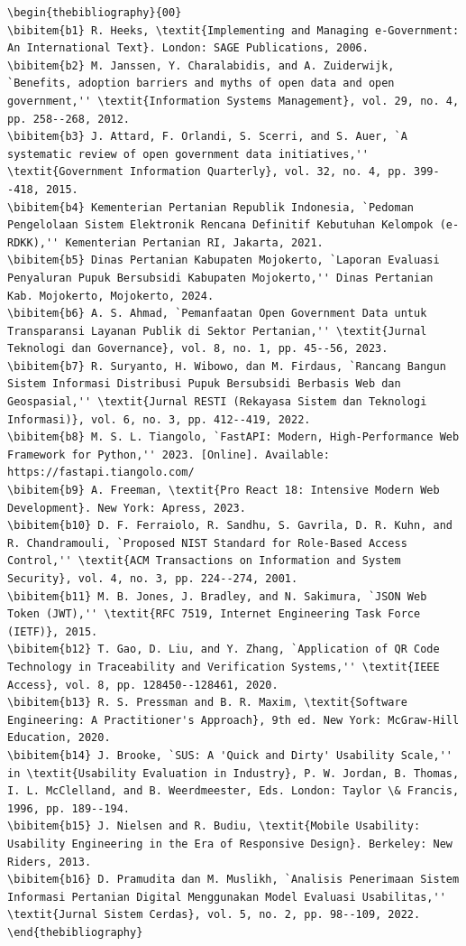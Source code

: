 \documentclass[conference]{IEEEtran}
\begin{document}
\begin{lstlisting}
\begin{thebibliography}{00}
\bibitem{b1} R. Heeks, \textit{Implementing and Managing e-Government: An International Text}. London: SAGE Publications, 2006.
\bibitem{b2} M. Janssen, Y. Charalabidis, and A. Zuiderwijk, `Benefits, adoption barriers and myths of open data and open government,'' \textit{Information Systems Management}, vol. 29, no. 4, pp. 258--268, 2012.
\bibitem{b3} J. Attard, F. Orlandi, S. Scerri, and S. Auer, `A systematic review of open government data initiatives,'' \textit{Government Information Quarterly}, vol. 32, no. 4, pp. 399--418, 2015.
\bibitem{b4} Kementerian Pertanian Republik Indonesia, `Pedoman Pengelolaan Sistem Elektronik Rencana Definitif Kebutuhan Kelompok (e-RDKK),'' Kementerian Pertanian RI, Jakarta, 2021.
\bibitem{b5} Dinas Pertanian Kabupaten Mojokerto, `Laporan Evaluasi Penyaluran Pupuk Bersubsidi Kabupaten Mojokerto,'' Dinas Pertanian Kab. Mojokerto, Mojokerto, 2024.
\bibitem{b6} A. S. Ahmad, `Pemanfaatan Open Government Data untuk Transparansi Layanan Publik di Sektor Pertanian,'' \textit{Jurnal Teknologi dan Governance}, vol. 8, no. 1, pp. 45--56, 2023.
\bibitem{b7} R. Suryanto, H. Wibowo, dan M. Firdaus, `Rancang Bangun Sistem Informasi Distribusi Pupuk Bersubsidi Berbasis Web dan Geospasial,'' \textit{Jurnal RESTI (Rekayasa Sistem dan Teknologi Informasi)}, vol. 6, no. 3, pp. 412--419, 2022.
\bibitem{b8} M. S. L. Tiangolo, `FastAPI: Modern, High-Performance Web Framework for Python,'' 2023. [Online]. Available: https://fastapi.tiangolo.com/
\bibitem{b9} A. Freeman, \textit{Pro React 18: Intensive Modern Web Development}. New York: Apress, 2023.
\bibitem{b10} D. F. Ferraiolo, R. Sandhu, S. Gavrila, D. R. Kuhn, and R. Chandramouli, `Proposed NIST Standard for Role-Based Access Control,'' \textit{ACM Transactions on Information and System Security}, vol. 4, no. 3, pp. 224--274, 2001.
\bibitem{b11} M. B. Jones, J. Bradley, and N. Sakimura, `JSON Web Token (JWT),'' \textit{RFC 7519, Internet Engineering Task Force (IETF)}, 2015.
\bibitem{b12} T. Gao, D. Liu, and Y. Zhang, `Application of QR Code Technology in Traceability and Verification Systems,'' \textit{IEEE Access}, vol. 8, pp. 128450--128461, 2020.
\bibitem{b13} R. S. Pressman and B. R. Maxim, \textit{Software Engineering: A Practitioner's Approach}, 9th ed. New York: McGraw-Hill Education, 2020.
\bibitem{b14} J. Brooke, `SUS: A 'Quick and Dirty' Usability Scale,'' in \textit{Usability Evaluation in Industry}, P. W. Jordan, B. Thomas, I. L. McClelland, and B. Weerdmeester, Eds. London: Taylor \& Francis, 1996, pp. 189--194.
\bibitem{b15} J. Nielsen and R. Budiu, \textit{Mobile Usability: Usability Engineering in the Era of Responsive Design}. Berkeley: New Riders, 2013.
\bibitem{b16} D. Pramudita dan M. Muslikh, `Analisis Penerimaan Sistem Informasi Pertanian Digital Menggunakan Model Evaluasi Usabilitas,'' \textit{Jurnal Sistem Cerdas}, vol. 5, no. 2, pp. 98--109, 2022.
\end{thebibliography}


\end{lstlisting}
\end{document}
